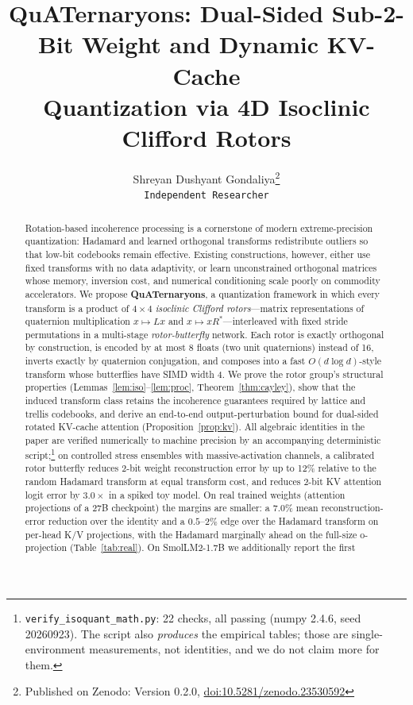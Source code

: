 \documentclass{article}
\title{QuATernaryons: Dual-Sided Sub-2-Bit Weight and Dynamic KV-Cache\\
Quantization via 4D Isoclinic Clifford Rotors}
\author{%
  Shreyan Dushyant Gondaliya\thanks{Published on Zenodo: Version 0.2.0, \href{https://doi.org/10.5281/zenodo.23530592}{doi:10.5281/zenodo.23530592}}\\
  \texttt{Independent Researcher}
}
\date{}
\begin{document}
\maketitle

\begin{abstract}
Rotation-based incoherence processing is a cornerstone of modern extreme-precision
quantization: Hadamard and learned orthogonal transforms redistribute outliers so
that low-bit codebooks remain effective. Existing constructions, however, either
use fixed transforms with no data adaptivity, or learn unconstrained orthogonal
matrices whose memory, inversion cost, and numerical conditioning scale poorly on
commodity accelerators. We propose \textbf{QuATernaryons}, a quantization
framework in which every transform is a product of $4\times4$
\emph{isoclinic Clifford rotors}---matrix representations of quaternion
multiplication $x\mapsto Lx$ and $x\mapsto xR^{*}$---interleaved with fixed
stride permutations in a multi-stage \emph{rotor-butterfly} network. Each rotor
is exactly orthogonal by construction, is encoded by at most 8 floats (two unit
quaternions) instead of 16, inverts exactly by quaternion conjugation, and
composes into a fast $O(d\log d)$-style transform whose butterflies have SIMD
width 4. We prove the rotor group's structural properties
(Lemmas~\ref{lem:iso}--\ref{lem:proc}, Theorem~\ref{thm:cayley}), show that the
induced transform class retains the incoherence guarantees required by
lattice and trellis codebooks, and derive an end-to-end output-perturbation
bound for dual-sided rotated KV-cache attention
(Proposition~\ref{prop:kv}). All algebraic identities in the paper are
verified numerically to machine precision by an accompanying deterministic
script;\footnote{\texttt{verify\_isoquant\_math.py}: 22 checks, all passing
(numpy 2.4.6, seed 20260923). The script also \emph{produces} the empirical
tables; those are single-environment measurements, not identities, and we do
not claim more for them.}
on controlled stress ensembles with massive-activation channels, a calibrated
rotor butterfly reduces 2-bit weight reconstruction error by up to 12\%
relative to the random Hadamard transform at equal transform cost, and reduces
2-bit KV attention logit error by $3.0\times$ in a spiked toy model. On real
trained weights (attention projections of a 27B checkpoint) the margins are
smaller: a $7.0\%$ mean reconstruction-error reduction over the identity and a
$0.5$--$2\%$ edge over the Hadamard transform on per-head K/V projections, with
the Hadamard marginally ahead on the full-size o-projection (Table~\ref{tab:real}). On SmolLM2-1.7B we additionally report the first

\end{abstract}
\end{document}
